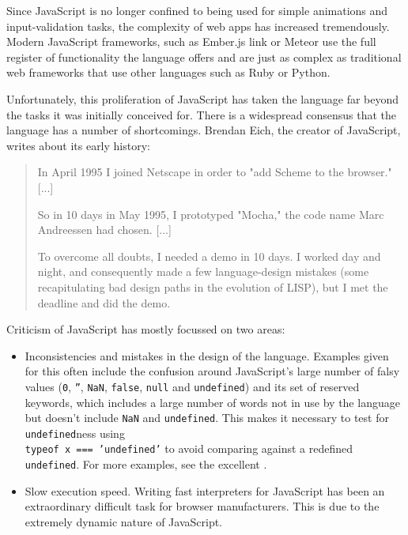 \documentclass[11pt]{report}
\begin{document}
Since JavaScript is no longer confined to being used for simple animations and input-validation tasks, the complexity of web apps has increased tremendously. Modern JavaScript frameworks, such as Ember.js link or Meteor use the full register of functionality the language offers and are just as complex as traditional web frameworks that use other languages such as Ruby or Python.

Unfortunately, this proliferation of JavaScript has taken the language far beyond the tasks it was initially conceived for. There is a widespread consensus that the language has a number of shortcomings. Brendan Eich, the creator of JavaScript, writes\cite{brendeich} about its early history:
\begin{quote}
In April 1995 I joined Netscape in order to "add Scheme to the browser." [...]

So in 10 days in May 1995, I prototyped "Mocha," the code name Marc Andreessen had chosen. [...]

To overcome all doubts, I needed a demo in 10 days. I worked day and night, and consequently made a few language-design mistakes (some recapitulating bad design paths in the evolution of LISP), but I met the deadline and did the demo.
\end{quote}

Criticism of JavaScript has mostly focussed on two areas:
\begin{itemize}
\item Inconsistencies and mistakes in the design of the language. Examples given for this often include the confusion around JavaScript's large number of falsy values (\texttt{0},  \texttt{''}, \texttt{NaN}, \texttt{false}, \texttt{null} and \texttt{undefined}) and its set of reserved keywords, which includes a large number of words not in use by the language but doesn't include \texttt{NaN} and \texttt{undefined}. This makes it necessary to test for \texttt{undefined}ness using \\
\mbox{\texttt{typeof x === 'undefined'}} to avoid comparing against a redefined \texttt{undefined}. For more examples, see the excellent \cite{jsgoodparts}.
\item Slow execution speed. Writing fast interpreters for JavaScript has been an extraordinary difficult task for browser manufacturers. This is due to the extremely dynamic nature of JavaScript.
\end{itemize}
\end{document}
